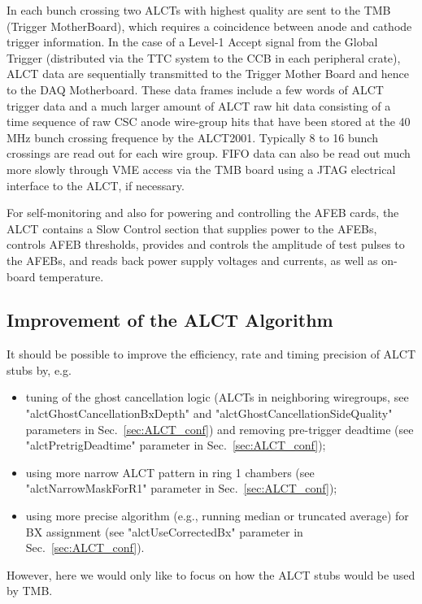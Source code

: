 In each bunch crossing two ALCTs with highest quality are sent to the TMB (Trigger MotherBoard), which requires a coincidence between anode and cathode trigger information. In the case of a Level-1 Accept signal from the Global Trigger (distributed via the TTC system to the CCB in each peripheral crate), ALCT data are sequentially transmitted to the Trigger Mother Board and hence to the DAQ Motherboard. These data frames include a few words of ALCT trigger data and a much larger amount of ALCT raw hit data consisting of a time sequence of raw CSC anode wire-group hits that have been stored at the 40 MHz bunch crossing frequence by the ALCT2001. Typically 8 to 16 bunch crossings are read out for each wire group. FIFO data can also be read out much more slowly through VME access via the TMB board using a JTAG electrical interface to the ALCT, if necessary.

For self-monitoring and also for powering and controlling the AFEB cards, the ALCT contains a Slow Control section that supplies power to the AFEBs, controls AFEB thresholds, provides and controls the amplitude of test pulses to the AFEBs, and reads back power supply voltages and currents, as well as on-board temperature. 

\subsection{Improvement of the ALCT Algorithm}
\label{subsec:alct_improvements}

It should be possible to improve the efficiency, rate and timing precision of ALCT stubs by, e.g.
\begin{itemize}
    \item tuning of the ghost cancellation logic (ALCTs in neighboring wiregroups, see "alctGhostCancellationBxDepth" and "alctGhostCancellationSideQuality" parameters in Sec.~\ref{sec:ALCT_conf}) and removing pre-trigger deadtime (see "alctPretrigDeadtime" parameter in Sec.~\ref{sec:ALCT_conf});
    \item using more narrow ALCT pattern in ring 1 chambers (see "alctNarrowMaskForR1" parameter in Sec.~\ref{sec:ALCT_conf});
    \item using more precise algorithm (e.g., running median or truncated average) for BX assignment (see "alctUseCorrectedBx"  parameter in Sec.~\ref{sec:ALCT_conf}).
\end{itemize}

However, here we would only like to focus on how the ALCT stubs would be used by TMB.

